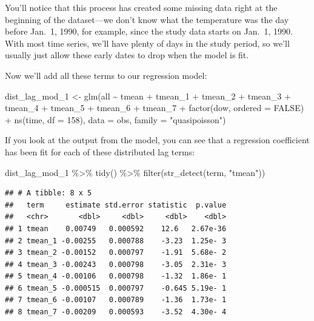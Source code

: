 \documentclass[
]{book}
\newenvironment{Shaded}{\begin{snugshade}}{\end{snugshade}}
\newcommand{\AttributeTok}[1]{\textcolor[rgb]{0.77,0.63,0.00}{#1}}
\newcommand{\ConstantTok}[1]{\textcolor[rgb]{0.00,0.00,0.00}{#1}}
\newcommand{\DecValTok}[1]{\textcolor[rgb]{0.00,0.00,0.81}{#1}}
\newcommand{\FunctionTok}[1]{\textcolor[rgb]{0.00,0.00,0.00}{#1}}
\newcommand{\NormalTok}[1]{#1}
\newcommand{\OtherTok}[1]{\textcolor[rgb]{0.56,0.35,0.01}{#1}}
\newcommand{\SpecialCharTok}[1]{\textcolor[rgb]{0.00,0.00,0.00}{#1}}
\newcommand{\StringTok}[1]{\textcolor[rgb]{0.31,0.60,0.02}{#1}}
\begin{document}
You'll notice that this process has created some missing data right at the beginning of the
dataset---we don't know what the temperature was the day before Jan.~1, 1990, for example,
since the study data starts on Jan.~1, 1990. With most time series, we'll have plenty of
days in the study period, so we'll usually just allow these early dates to drop when the
model is fit.

Now we'll add all these terms to our regression model:

\begin{Shaded}
\begin{Highlighting}[]
\NormalTok{dist\_lag\_mod\_1 }\OtherTok{\textless{}{-}} \FunctionTok{glm}\NormalTok{(all }\SpecialCharTok{\textasciitilde{}}\NormalTok{ tmean }\SpecialCharTok{+}\NormalTok{ tmean\_1 }\SpecialCharTok{+}\NormalTok{ tmean\_2 }\SpecialCharTok{+}\NormalTok{ tmean\_3 }\SpecialCharTok{+}\NormalTok{ tmean\_4 }\SpecialCharTok{+} 
\NormalTok{                        tmean\_5 }\SpecialCharTok{+}\NormalTok{ tmean\_6 }\SpecialCharTok{+}\NormalTok{ tmean\_7 }\SpecialCharTok{+} 
                        \FunctionTok{factor}\NormalTok{(dow, }\AttributeTok{ordered =} \ConstantTok{FALSE}\NormalTok{) }\SpecialCharTok{+}
                          \FunctionTok{ns}\NormalTok{(time, }\AttributeTok{df =} \DecValTok{158}\NormalTok{), }
                        \AttributeTok{data =}\NormalTok{ obs, }\AttributeTok{family =} \StringTok{"quasipoisson"}\NormalTok{)}
\end{Highlighting}
\end{Shaded}

If you look at the output from the model, you can see that a regression coefficient has been
fit for each of these distributed lag terms:

\begin{Shaded}
\begin{Highlighting}[]
\NormalTok{dist\_lag\_mod\_1 }\SpecialCharTok{\%\textgreater{}\%} 
  \FunctionTok{tidy}\NormalTok{() }\SpecialCharTok{\%\textgreater{}\%} 
  \FunctionTok{filter}\NormalTok{(}\FunctionTok{str\_detect}\NormalTok{(term, }\StringTok{"tmean"}\NormalTok{))}
\end{Highlighting}
\end{Shaded}

\begin{verbatim}
## # A tibble: 8 x 5
##   term     estimate std.error statistic  p.value
##   <chr>       <dbl>     <dbl>     <dbl>    <dbl>
## 1 tmean    0.00749   0.000592    12.6   2.67e-36
## 2 tmean_1 -0.00255   0.000788    -3.23  1.25e- 3
## 3 tmean_2 -0.00152   0.000797    -1.91  5.68e- 2
## 4 tmean_3 -0.00243   0.000798    -3.05  2.31e- 3
## 5 tmean_4 -0.00106   0.000798    -1.32  1.86e- 1
## 6 tmean_5 -0.000515  0.000797    -0.645 5.19e- 1
## 7 tmean_6 -0.00107   0.000789    -1.36  1.73e- 1
## 8 tmean_7 -0.00209   0.000593    -3.52  4.30e- 4
\end{verbatim}
\end{document}
